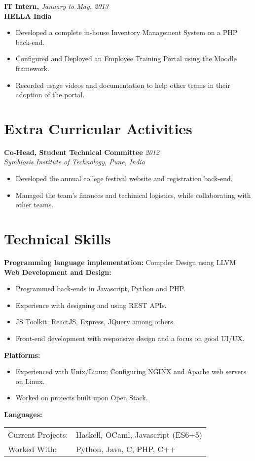 \documentclass[a4paper,overlapped]{res}
\begin{document}
\begin{resume}
  \textbf{IT Intern,} \hfill \textit{January to May, 2013}\\
  \textbf{HELLA India}
  \begin{itemize}
  \item Developed a complete in-house Inventory Management System on a PHP
    back-end. 
  \item Configured and Deployed an Employee Training Portal using the
    Moodle framework.
  \item Recorded usage videos and documentation to help other teams in their
    adoption of the portal.
  \end{itemize}

  \section{Extra Curricular Activities}  

  \textbf{Co-Head, Student Technical Committee}   \hfill \textit{2012} \\
  \textit{Symbiosis Institute of Technology, Pune, India}
  \begin{itemize}
  \item Developed the annual college festival website and registration back-end.
  \item Managed the team's finances and techinical logistics, while collaborating 
    with other teams.
  \end{itemize}

  \section{Technical Skills} 
  \textbf{Programming language implementation:} Compiler Design using LLVM \\
  \textbf{Web Development and Design:}
  \begin{itemize}
  \item Programmed back-ends in Javascript, Python and PHP.
  \item Experience with designing and using REST APIs.
  \item JS Toolkit: ReactJS, Express, JQuery among
    others.
  \item Front-end development with responsive design and a focus on good UI/UX.
  \end{itemize}
  \textbf{Platforms:}
  \begin{itemize}
  \item Experienced with Unix/Linux; Configuring NGINX and Apache web servers on
    Linux.
  \item Worked on projects built upon Open Stack. 
  \end{itemize}
  \textbf{Languages:} \\ 
  \begin{tabular}{l l}
    Current Projects: & Haskell, OCaml, Javascript (ES6+5) \\ 
    Worked With: & Python, Java, C, PHP, C++
  \end{tabular}



\end{resume}
\end{document}

